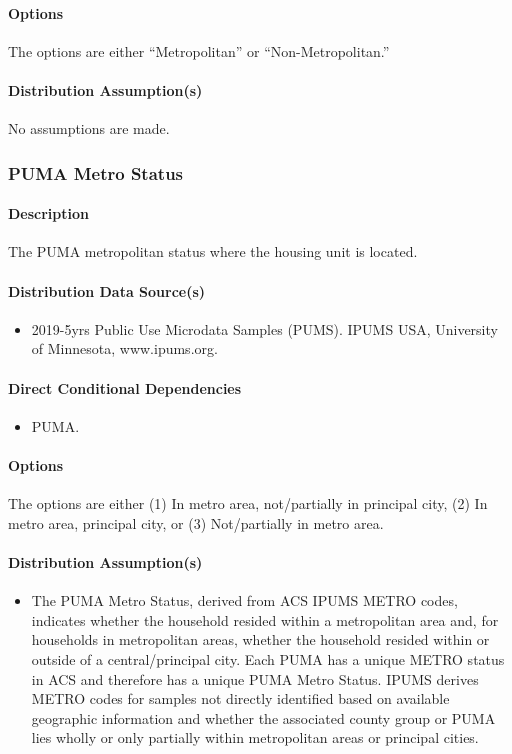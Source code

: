 \paragraph{Options}
The options are either ``Metropolitan'' or ``Non-Metropolitan.''

\paragraph{Distribution Assumption(s)}
No assumptions are made.


\subsubsection{PUMA Metro Status}
\paragraph{Description}
The PUMA metropolitan status where the housing unit is located.

\paragraph{Distribution Data Source(s)}
\begin{itemize}
    \item 2019-5yrs Public Use Microdata Samples (PUMS). IPUMS USA, University of Minnesota, www.ipums.org.
\end{itemize}

\paragraph{Direct Conditional Dependencies}
\begin{itemize}
    \item PUMA.
\end{itemize}

\paragraph{Options}
The options are either (1) In metro area, not/partially in principal city, (2) In metro area, principal city, or (3) Not/partially in metro area. 

\paragraph{Distribution Assumption(s)}
\begin{itemize}
    \item The PUMA Metro Status, derived from ACS IPUMS METRO codes, indicates whether the household resided within a metropolitan area and, for households in metropolitan areas, whether the household resided within or outside of a central/principal city. Each PUMA has a unique METRO status in ACS and therefore has a unique PUMA Metro Status. IPUMS derives METRO codes for samples not directly identified based on available geographic information and whether the associated county group or PUMA lies wholly or only partially within metropolitan areas or principal cities.
\end{itemize}

